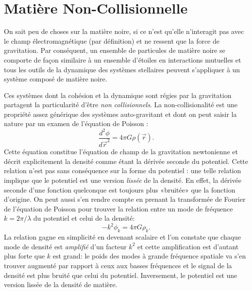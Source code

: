 \section{Matière Non-Collisionnelle}
On sait peu de choses sur la matière noire, si ce n'est qu'elle n'interagit pas avec le champ électromagnétique (par définition) et ne ressent que la force de gravitation. Par conséquent, un ensemble de particules de matière noire se comporte de façon similaire à un ensemble d'étoiles en interactions mutuelles et tous les outils de la dynamique des systèmes stellaires peuvent s'appliquer à un système composé de matière noire.

Ces systèmes dont la cohésion et la dynamique sont régies par la gravitation partagent la particularité d'être \textit{non collisionnels}. La non-collisionalité est une propriété assez générique des systèmes auto-gravitant  et dont on peut saisir la nature par un examen de l'équation de Poisson  :
\begin{equation}
\frac{d^2\phi}{d\vec{r}^2}=4\pi G\rho(\vec{r}).
\end{equation} 
Cette équation constitue l'équation de champ de la gravitation newtonienne et décrit explicitement la densité comme étant la dérivée seconde du potentiel. Cette relation n'est pas sans conséquence sur la forme du potentiel : une telle relation implique que le potentiel est une version \textit{lissée} de la densité. En effet, la dérivée seconde d'une fonction quelconque est toujours plus «bruitée» que la fonction d'origine. On peut aussi s'en rendre compte en prenant la transformée de Fourier de l'équation de Poisson pour trouver la relation entre un mode de fréquence $k=2\pi/\lambda$ du potentiel et celui de la densité:
\begin{equation}
-k^2 \phi_k=4\pi G \rho_k.
\end{equation}
La relation gagne en simplicité en devenant scalaire et l’on constate que chaque mode de densité est \textit{amplifié} d'un facteur $k^2$ et cette amplification est d'autant plus forte que $k$ est grand: le poids des modes à grande fréquence spatiale va s'en trouver augmenté par rapport à ceux aux basses fréquences et le signal de la densité est plus bruité que celui du potentiel. Inversement, le potentiel est une version lissée de la densité de matière.
